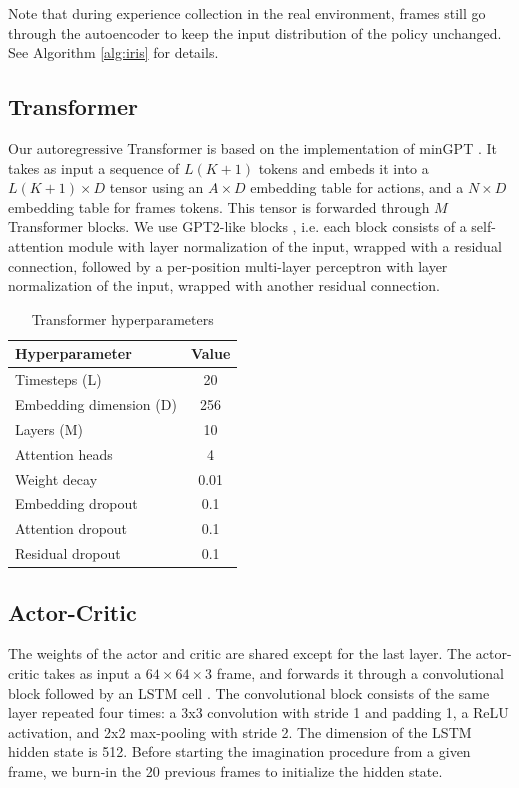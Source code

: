 Note that during experience collection in the real environment, frames still go through the autoencoder to keep the input distribution of the policy unchanged. See Algorithm \ref{alg:iris} for details.

\subsection{Transformer}

Our autoregressive Transformer is based on the implementation of minGPT \citep{mingpt}. It takes as input a sequence of $L(K + 1)$ tokens and embeds it into a $L(K + 1) \times D$ tensor using an $A \times D$ embedding table for actions, and a $N \times D$ embedding table for frames tokens. This tensor is forwarded through $M$ Transformer blocks. We use GPT2-like blocks \citep{radford_gpt2}, i.e. each block consists of a self-attention module with layer normalization of the input, wrapped with a residual connection, followed by a per-position multi-layer perceptron with layer normalization of the input, wrapped with another residual connection.

\begin{table}[h]
  \caption{Transformer hyperparameters}
  \label{tables:transformer}
  \centering
  \begin{tabular}{lc}
    \toprule
    Hyperparameter     & Value \\
    \midrule
    Timesteps (L)     & 20 \\
    Embedding dimension (D) & 256 \\
    Layers (M) & 10 \\
    Attention heads & 4 \\
    Weight decay & 0.01 \\
    Embedding dropout & 0.1 \\
    Attention dropout & 0.1 \\
    Residual dropout & 0.1 \\
    \bottomrule
  \end{tabular}
\end{table}

\newpage

\subsection{Actor-Critic}

The weights of the actor and critic are shared except for the last layer. The actor-critic takes as input a $64\times64\times3$ frame, and forwards it through a convolutional block followed by an LSTM cell \citep{a3c,lstm,Gers2000}. The convolutional block consists of the same layer repeated four times: a 3x3 convolution with stride 1 and padding 1, a ReLU activation, and 2x2 max-pooling with stride 2. The dimension of the LSTM hidden state is 512. Before starting the imagination procedure from a given frame, we burn-in \citep{r2d2} the 20 previous frames to initialize the hidden state.

